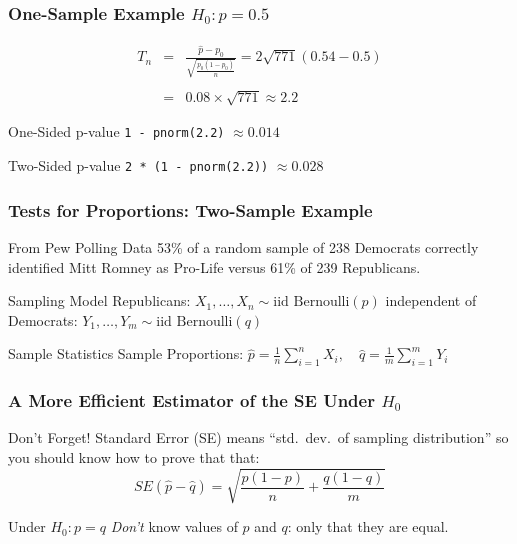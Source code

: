 \documentclass[handout]{beamer}
\begin{document}
\begin{frame}
	\frametitle{One-Sample Example $H_0\colon p = 0.5$}

\vspace{1em}

	\begin{eqnarray*}
		T_n &=& \frac{\widehat{p} - p_0}{\sqrt{\displaystyle \frac{p_0(1 - p_0)}{n}}} = 2 \sqrt{771}(0.54 - 0.5)\\ \\
		&=& 0.08 \times \sqrt{771} \approx 2.2
	\end{eqnarray*}
	\begin{block}
		{One-Sided p-value}
		\texttt{1 - pnorm(2.2)} $\approx 0.014$
	\end{block}
	\begin{block}
		{Two-Sided p-value}
		\texttt{2 * (1 - pnorm(2.2))} $\approx 0.028$
	\end{block}
\end{frame}
\begin{frame}
	\frametitle{Tests for Proportions: Two-Sample Example}
	\begin{block}
		{From Pew Polling Data}
		53\% of a random sample of 238 Democrats correctly identified Mitt Romney as Pro-Life versus 61\% of 239 Republicans.
	\end{block}
	\begin{block}
		{Sampling Model}
		Republicans: $X_1, \hdots, X_{n} \sim \mbox{iid Bernoulli}(p)$ independent of\\
		Democrats: $Y_1, \hdots,Y_{m} \sim \mbox{iid Bernoulli}(q)$ 
	\end{block}
	\begin{block}
		{Sample Statistics}
		Sample Proportions: $\displaystyle\widehat{p} = \frac{1}{n}\sum_{i=1}^{n} X_i, \quad\displaystyle\widehat{q} = \frac{1}{m}\sum_{i=1}^{m} Y_i$
	\end{block}

	\vspace{1em}

	\hfill \alert{}
\end{frame}
\begin{frame}
	\frametitle{A More Efficient Estimator of the SE Under $H_0$}
	\begin{alertblock}
		{Don't Forget!}
		Standard Error (SE) means ``std.\ dev.\ of sampling distribution'' so you should know how to prove that that:
	$$SE(\widehat{p} - \widehat{q}) = \sqrt{\frac{p(1-p)}{n} + \frac{q(1-q)}{m}}$$
	\end{alertblock}

	\begin{block}
		{Under $H_0\colon p = q$}
		\emph{Don't} know values of $p$ and $q$: only that they are equal.
	\end{block}

\end{frame}
\end{document}

